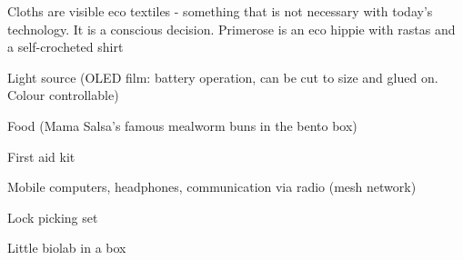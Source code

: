 \newpage
\begin{npcBox}[title=Primrose continued]
    \begin{npcDescription}
    Cloths are visible eco textiles - something that is not necessary with today's technology. It is a conscious decision.
    Primerose is an eco hippie with rastas and a self-crocheted shirt
    \end{npcDescription}


    \begin{equipment}
    \item Light source (OLED film: battery operation, can be cut to size and glued on. Colour controllable)
    \item Food (Mama Salsa's famous mealworm buns in the bento box)
    \item First aid kit
    \item Mobile computers, headphones, communication via radio (mesh network)
    \item Lock picking set
    \item Little biolab in a box
    \end{equipment}
\end{npcBox}



